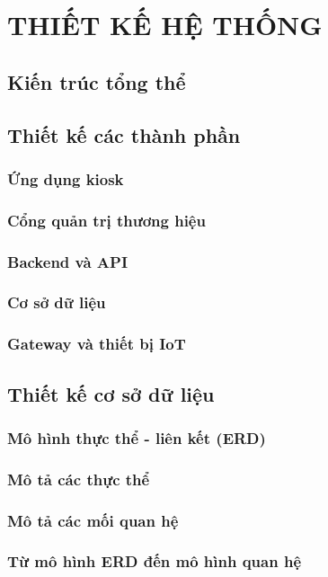 \chapter{THIẾT KẾ HỆ THỐNG}
\section{Kiến trúc tổng thể}
\section{Thiết kế các thành phần}
\subsection{Ứng dụng kiosk}
\subsection{Cổng quản trị thương hiệu}
\subsection{Backend và API}
\subsection{Cơ sở dữ liệu}
\subsection{Gateway và thiết bị IoT}
\section{Thiết kế cơ sở dữ liệu}
\subsection{Mô hình thực thể - liên kết (ERD)}
\subsection{Mô tả các thực thể}
\subsection{Mô tả các mối quan hệ}
\subsection{Từ mô hình ERD đến mô hình quan hệ}
